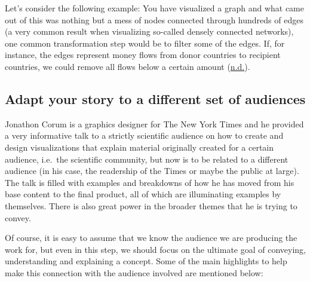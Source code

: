 \documentclass[]{book}
\begin{document}
Let's consider the following example: You have visualized a graph and what came out of this was nothing but a mess of nodes connected through hundreds of edges (a very common result when visualizing so-called densely connected networks), one common transformation step would be to filter some of the edges. If, for instance, the edges represent money flows from donor countries to recipient countries, we could remove all flows below a certain amount (\protect\hyperlink{ref-dataviz_bestprac}{n.d.}).

\hypertarget{adapt-your-story-to-a-different-set-of-audiences}{%
\subsection{Adapt your story to a different set of audiences}\label{adapt-your-story-to-a-different-set-of-audiences}}

Jonathon Corum is a graphics designer for The New York Times and he provided a very informative talk to a strictly scientific audience on how to create and design visualizations that explain material originally created for a certain audience, i.e.~the scientific community, but now is to be related to a different audience (in his case, the readership of the Times or maybe the public at large). The talk is filled with examples and breakdowns of how he has moved from his base content to the final product, all of which are illuminating examples by themselves. There is also great power in the broader themes that he is trying to convey.

Of course, it is easy to assume that we know the audience we are producing the work for, but even in this step, we should focus on the ultimate goal of conveying, understanding and explaining a concept. Some of the main highlights to help make this connection with the audience involved are mentioned below:
\end{document}
